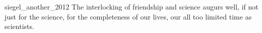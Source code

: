 \begin{acknowledgements}


\begin{itquote}{siegel_another_2012}
The interlocking of friendship and science augurs well, if not just for the science, for the completeness of our lives, our all too limited time as scientists.
\end{itquote}









\end{acknowledgements}
